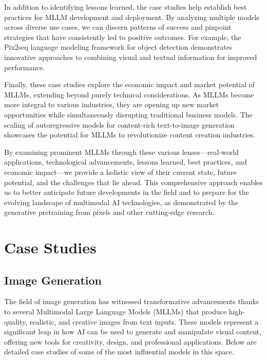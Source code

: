 In addition to identifying lessons learned, the case studies help establish best practices for MLLM development and deployment. By analyzing multiple models across diverse use cases, we can discern patterns of success and pinpoint strategies that have consistently led to positive outcomes. For example, the Pix2seq language modeling framework for object detection \cite{chen2023pix2seq} demonstrates innovative approaches to combining visual and textual information for improved performance.

Finally, these case studies explore the economic impact and market potential of MLLMs, extending beyond purely technical considerations. As MLLMs become more integral to various industries, they are opening up new market opportunities while simultaneously disrupting traditional business models. The scaling of autoregressive models for content-rich text-to-image generation \cite{yu2022scaling} showcases the potential for MLLMs to revolutionize content creation industries.

By examining prominent MLLMs through these various lenses—real-world applications, technological advancements, lessons learned, best practices, and economic impact—we provide a holistic view of their current state, future potential, and the challenges that lie ahead. This comprehensive approach enables us to better anticipate future developments in the field and to prepare for the evolving landscape of multimodal AI technologies, as demonstrated by the generative pretraining from pixels \cite{chen2023generative} and other cutting-edge research.


\section{Case Studies}

\subsection{Image Generation}

The field of image generation has witnessed transformative advancements thanks to several Multimodal Large Language Models (MLLMs) that produce high-quality, realistic, and creative images from text inputs. These models represent a significant leap in how AI can be used to generate and manipulate visual content, offering new tools for creativity, design, and professional applications. Below are detailed case studies of some of the most influential models in this space.

